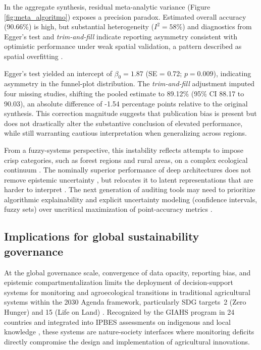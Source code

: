 \documentclass[lineno,pdflatex,sn-apa]{sn-jnl}
\begin{document}
In the aggregate synthesis, residual meta-analytic variance (Figure \ref{fig:meta_algoritmo}) exposes a precision paradox. Estimated overall accuracy (90.66\%) is high, but substantial heterogeneity ($I^2=58\%$) and diagnostics from Egger's test and \textit{trim-and-fill} indicate reporting asymmetry consistent with optimistic performance under weak spatial validation, a pattern described as spatial overfitting \citep{Ploton2020,Meyer2021}.

Egger's test yielded an intercept of $\beta_0=1.87$ (SE = 0.72; $p=0.009$), indicating asymmetry in the funnel-plot distribution. The \textit{trim-and-fill} adjustment imputed four missing studies, shifting the pooled estimate to 89.12\% (95\% CI 88.17 to 90.03), an absolute difference of -1.54 percentage points relative to the original synthesis. This correction magnitude suggests that publication bias is present but does not drastically alter the substantive conclusion of elevated performance, while still warranting cautious interpretation when generalizing across regions.

From a fuzzy-systems perspective, this instability reflects attempts to impose crisp categories, such as forest regions and rural areas, on a complex ecological continuum \citep{Fisher2010}. The nominally superior performance of deep architectures does not remove epistemic uncertainty \citep{Hullermeier2021}, but relocates it to latent representations that are harder to interpret \citep{Tuia2021}. The next generation of auditing tools may need to prioritize algorithmic explainability and explicit uncertainty modeling (confidence intervals, fuzzy sets) over uncritical maximization of point-accuracy metrics \citep{Rudin2019,Ghilardi2025}.

\subsection{Implications for global sustainability governance}

At the global governance scale, convergence of data opacity, reporting bias, and epistemic compartmentalization limits the deployment of decision-support systems for monitoring and agroecological transitions in traditional agricultural systems \citep{Wezel2009} within the 2030 Agenda framework, particularly SDG targets~2 (Zero Hunger) and 15 (Life on Land) \citep{UN2015}. Recognized by the GIAHS program in 24 countries and integrated into IPBES assessments on indigenous and local knowledge \citep{Koohafkan2011,IPBES2019}, these systems are nature-society interfaces where monitoring deficits directly compromise the design and implementation of agricultural innovations.
\end{document}

